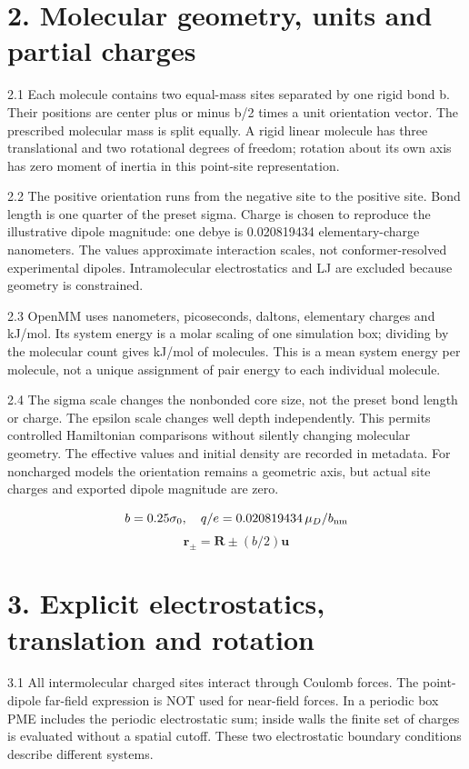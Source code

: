\documentclass[11pt]{article}
\begin{document}
\section*{2. Molecular geometry, units and partial charges}
2.1 Each molecule contains two equal-mass sites separated by one rigid bond b. Their positions are center plus or minus b/2 times a unit orientation vector. The prescribed molecular mass is split equally. A rigid linear molecule has three translational and two rotational degrees of freedom; rotation about its own axis has zero moment of inertia in this point-site representation.


2.2 The positive orientation runs from the negative site to the positive site. Bond length is one quarter of the preset sigma. Charge is chosen to reproduce the illustrative dipole magnitude: one debye is 0.020819434 elementary-charge nanometers. The values approximate interaction scales, not conformer-resolved experimental dipoles. Intramolecular electrostatics and LJ are excluded because geometry is constrained.


2.3 OpenMM uses nanometers, picoseconds, daltons, elementary charges and kJ/mol. Its system energy is a molar scaling of one simulation box; dividing by the molecular count gives kJ/mol of molecules. This is a mean system energy per molecule, not a unique assignment of pair energy to each individual molecule.


2.4 The sigma scale changes the nonbonded core size, not the preset bond length or charge. The epsilon scale changes well depth independently. This permits controlled Hamiltonian comparisons without silently changing molecular geometry. The effective values and initial density are recorded in metadata. For noncharged models the orientation remains a geometric axis, but actual site charges and exported dipole magnitude are zero.


\[b=0.25\sigma_0,\quad q/e=0.020819434\,\mu_D/b_{\rm nm}\]
\[\mathbf{r}_{\pm}=\mathbf{R}\pm(b/2)\mathbf{u}\]
\section*{3. Explicit electrostatics, translation and rotation}
3.1 All intermolecular charged sites interact through Coulomb forces. The point-dipole far-field expression is NOT used for near-field forces. In a periodic box PME includes the periodic electrostatic sum; inside walls the finite set of charges is evaluated without a spatial cutoff. These two electrostatic boundary conditions describe different systems.
\end{document}
